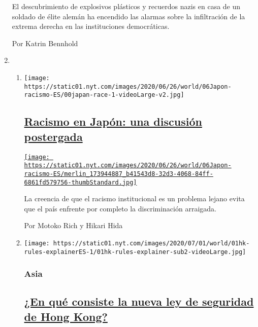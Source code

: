 \begin{enumerate}
  El descubrimiento de explosivos plásticos y recuerdos nazis en casa de
  un soldado de élite alemán ha encendido las alarmas sobre la
  infiltración de la extrema derecha en las instituciones democráticas.

  Por Katrin Bennhold
\item
  \begin{enumerate}
  \def\labelenumii{\arabic{enumii}.}
  \item
    \texttt{[image: https://static01.nyt.com/images/2020/06/26/world/06Japon-racismo-ES/00japan-race-1-videoLarge-v2.jpg]}

    \hypertarget{racismo-en-japuxf3n-una-discusiuxf3n-postergada}{%
    \subsection{\texorpdfstring{\href{/es/2020/07/06/espanol/mundo/racismo-japon-protestas.html}{Racismo
    en Japón: una discusión
    postergada}}{Racismo en Japón: una discusión postergada}}\label{racismo-en-japuxf3n-una-discusiuxf3n-postergada}}

    \href{/es/2020/07/06/espanol/mundo/racismo-japon-protestas.html}{\texttt{[image: https://static01.nyt.com/images/2020/06/26/world/06Japon-racismo-ES/merlin\_173944887\_b41543d8-32d3-4068-84ff-6861fd579756-thumbStandard.jpg]}}

    La creencia de que el racismo institucional es un problema lejano
    evita que el país enfrente por completo la discriminación arraigada.

    Por Motoko Rich y Hikari Hida
  \item
    \texttt{[image: https://static01.nyt.com/images/2020/07/01/world/01hk-rules-explainerES-1/01hk-rules-explainer-sub2-videoLarge.jpg]}

    \hypertarget{asia}{%
    \subsubsection{Asia}\label{asia}}

    \hypertarget{en-quuxe9-consiste-la-nueva-ley-de-seguridad-de-hong-kong}{%
    \subsection{\texorpdfstring{\href{/es/2020/07/01/espanol/mundo/china-ley-seguridad-Hong-Kong.html}{¿En
    qué consiste la nueva ley de seguridad de Hong
    Kong?}}{¿En qué consiste la nueva ley de seguridad de Hong Kong?}}\label{en-quuxe9-consiste-la-nueva-ley-de-seguridad-de-hong-kong}}


\end{enumerate}
\end{enumerate}
